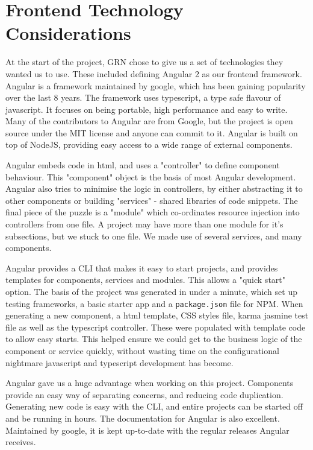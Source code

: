 \documentclass{l3proj}
\begin{document}
\section{Frontend Technology Considerations}
\label{sec:frontend}

At the start of the project, GRN chose to give us a set of technologies they 
 wanted us to use. These included defining Angular 2 as our frontend framework.
 Angular is a framework maintained by google, which has been gaining popularity
 over the last 8 years\cite{angularjsoverview}. The framework uses typescript, 
 a type safe flavour of javascript. It focuses on being portable, high performance
 and easy to write\cite{angular_features}. Many of the contributors to Angular are from Google, but 
 the project is open source under the MIT license and anyone can commit to 
 it\cite{angularjsoverview}. Angular is built on top of NodeJS, providing 
 easy access to a wide range of external components.
 
Angular embeds code in html, and uses a "controller" to define component behaviour. This
 "component" object is the basis of most Angular development. Angular also tries 
 to minimise the logic in controllers, by either abstracting it to other components
 or building "services" - shared libraries of code snippets. The final piece of the puzzle
 is a "module" which co-ordinates resource injection into controllers from one 
 file. A project may have more than one module for it's subsections, but we stuck to
 one file. We made use of several services, and many components.
  
Angular provides a CLI that makes it easy to start projects, and provides 
 templates for components, services and modules. This allows a "quick start"
 option. The basis of the project was generated in under a minute, which set up
 testing frameworks, a basic starter app and a \texttt{package.json} file for NPM.
 When generating a new component, a html template, CSS styles file, karma 
 jasmine test file as well as the typescript controller. These were populated
 with template code to allow easy starts. This helped ensure we could get to 
 the business logic of the component or service quickly, without wasting time 
 on the configurational nightmare javascript and typescript development has
 become.
  
    
  
Angular gave us a huge advantage when working on this project. Components provide
 an easy way of separating concerns, and reducing code duplication. Generating new
 code is easy with the CLI, and entire projects can be started off and be running
 in hours. The documentation for Angular is also excellent. Maintained by google,
 it is kept up-to-date with the regular releases Angular receives.
 
\end{document}
